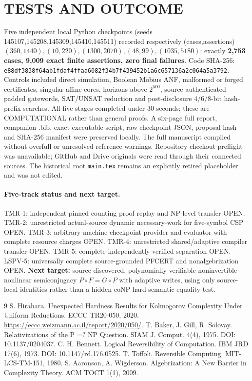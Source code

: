 \documentclass[11pt]{article}
\begin{document}
\section{TESTS AND OUTCOME}
Five independent local Python checkpoints (seeds 145107,145208,145309,145410,145511) recorded respectively (cases,assertions) $(360,1440),(10,220),(1300,2070),(48,99),(1035,5180)$: exactly \textbf{2,753 cases, 9,009 exact finite assertions, zero final failures}. Code SHA-256: \texttt{e88df3838f64ab1fdaf4ffaa6082f34b7f439452b1a6c657136a2c064a5a3792}. Controls included direct simulation, Boolean M\"obius ANF, malformed or forged certificates, singular affine cores, horizons above $2^{500}$, source-authenticated padded gatewords, SAT/UNSAT reduction and post-disclosure 4/6/8-bit hash-prefix searches. All five stages completed under 30 seconds; these are COMPUTATIONAL rather than general proofs. A six-page full report, companion .bib, exact executable script, raw checkpoint JSON, proposal hash and SHA-256 manifest were preserved locally. The full manuscript compiled without overfull or unresolved reference warnings. Repository checkout preflight was unavailable; GitHub and Drive originals were read through their connected sources. The historical root \texttt{main.tex} remains an explicitly retired placeholder and was not edited.

\paragraph{Five-track status and next target.}
TMR-1: independent pinned counting proof replay and NP-level transfer OPEN. TMR-2: unrestricted actual-source dynamic necessary-work for five-symbol CSP OPEN. TMR-3: arbitrary-machine checkpoint provider and evaluator with complete resource charges OPEN. TMR-4: unrestricted shared/adaptive compiler transfer OPEN. TMR-5: complete independently verified separation OPEN. LSPV-5: universally complete source-grounded PFCERT and nonalgebrization OPEN. \textbf{Next target:} source-discovered, polynomially verifiable noninvertible nonlinear semiconjugacy $P\circ F=G\circ P$ with adaptive writes, using only source-local identities rather than a hidden coNP-hard semantic equality test.

\begin{thebibliography}{9}
 S. Hirahara. Unexpected Hardness Results for Kolmogorov Complexity Under Uniform Reductions. ECCC TR20-050, 2020. \url{https://eccc.weizmann.ac.il/report/2020/050/}.
 T. Baker, J. Gill, R. Solovay. Relativizations of the P =? NP Question. SIAM J. Comput. 4(4), 1975. DOI: 10.1137/0204037.
 C. H. Bennett. Logical Reversibility of Computation. IBM JRD 17(6), 1973. DOI: 10.1147/rd.176.0525.
 T. Toffoli. Reversible Computing. MIT-LCS-TM-151, 1980.
 S. Aaronson, A. Wigderson. Algebrization: A New Barrier in Complexity Theory. ACM TOCT 1(1), 2009.
\end{thebibliography}
\end{document}
